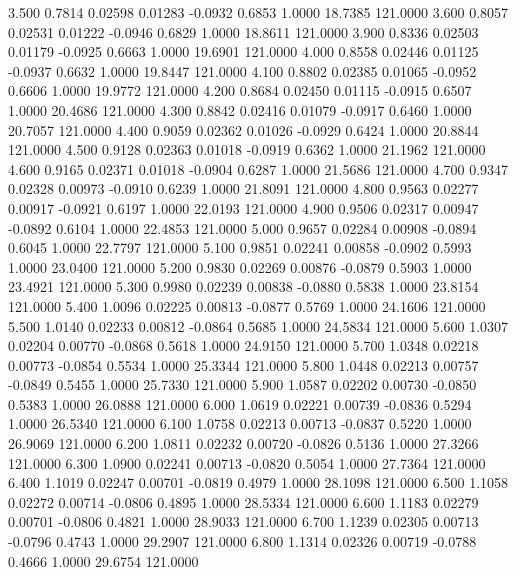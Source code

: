    3.500   0.7814   0.02598   0.01283  -0.0932   0.6853   1.0000  18.7385 121.0000
   3.600   0.8057   0.02531   0.01222  -0.0946   0.6829   1.0000  18.8611 121.0000
   3.900   0.8336   0.02503   0.01179  -0.0925   0.6663   1.0000  19.6901 121.0000
   4.000   0.8558   0.02446   0.01125  -0.0937   0.6632   1.0000  19.8447 121.0000
   4.100   0.8802   0.02385   0.01065  -0.0952   0.6606   1.0000  19.9772 121.0000
   4.200   0.8684   0.02450   0.01115  -0.0915   0.6507   1.0000  20.4686 121.0000
   4.300   0.8842   0.02416   0.01079  -0.0917   0.6460   1.0000  20.7057 121.0000
   4.400   0.9059   0.02362   0.01026  -0.0929   0.6424   1.0000  20.8844 121.0000
   4.500   0.9128   0.02363   0.01018  -0.0919   0.6362   1.0000  21.1962 121.0000
   4.600   0.9165   0.02371   0.01018  -0.0904   0.6287   1.0000  21.5686 121.0000
   4.700   0.9347   0.02328   0.00973  -0.0910   0.6239   1.0000  21.8091 121.0000
   4.800   0.9563   0.02277   0.00917  -0.0921   0.6197   1.0000  22.0193 121.0000
   4.900   0.9506   0.02317   0.00947  -0.0892   0.6104   1.0000  22.4853 121.0000
   5.000   0.9657   0.02284   0.00908  -0.0894   0.6045   1.0000  22.7797 121.0000
   5.100   0.9851   0.02241   0.00858  -0.0902   0.5993   1.0000  23.0400 121.0000
   5.200   0.9830   0.02269   0.00876  -0.0879   0.5903   1.0000  23.4921 121.0000
   5.300   0.9980   0.02239   0.00838  -0.0880   0.5838   1.0000  23.8154 121.0000
   5.400   1.0096   0.02225   0.00813  -0.0877   0.5769   1.0000  24.1606 121.0000
   5.500   1.0140   0.02233   0.00812  -0.0864   0.5685   1.0000  24.5834 121.0000
   5.600   1.0307   0.02204   0.00770  -0.0868   0.5618   1.0000  24.9150 121.0000
   5.700   1.0348   0.02218   0.00773  -0.0854   0.5534   1.0000  25.3344 121.0000
   5.800   1.0448   0.02213   0.00757  -0.0849   0.5455   1.0000  25.7330 121.0000
   5.900   1.0587   0.02202   0.00730  -0.0850   0.5383   1.0000  26.0888 121.0000
   6.000   1.0619   0.02221   0.00739  -0.0836   0.5294   1.0000  26.5340 121.0000
   6.100   1.0758   0.02213   0.00713  -0.0837   0.5220   1.0000  26.9069 121.0000
   6.200   1.0811   0.02232   0.00720  -0.0826   0.5136   1.0000  27.3266 121.0000
   6.300   1.0900   0.02241   0.00713  -0.0820   0.5054   1.0000  27.7364 121.0000
   6.400   1.1019   0.02247   0.00701  -0.0819   0.4979   1.0000  28.1098 121.0000
   6.500   1.1058   0.02272   0.00714  -0.0806   0.4895   1.0000  28.5334 121.0000
   6.600   1.1183   0.02279   0.00701  -0.0806   0.4821   1.0000  28.9033 121.0000
   6.700   1.1239   0.02305   0.00713  -0.0796   0.4743   1.0000  29.2907 121.0000
   6.800   1.1314   0.02326   0.00719  -0.0788   0.4666   1.0000  29.6754 121.0000
